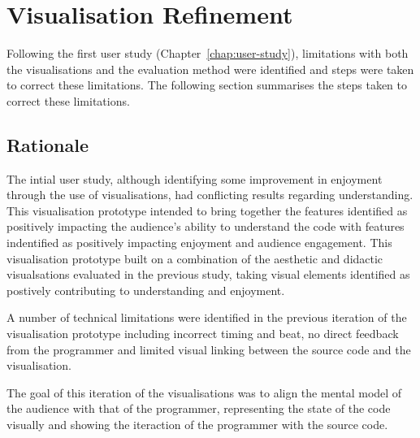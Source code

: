 
\chapter{Visualisation Refinement}
\label{chap:visualisation-refinement}


Following the first user study (Chapter~\ref{chap:user-study}), limitations with both the visualisations and the evaluation method were identified and steps were taken to correct these limitations. The following section summarises the steps taken to correct these limitations.

\section{Rationale}

The intial user study, although identifying some improvement in enjoyment through the use of visualisations, had conflicting results regarding understanding. This visualisation prototype intended to bring together the features identified as positively impacting the audience's ability to understand the code with features indentified as positively impacting enjoyment and audience engagement. This visualisation prototype built on a combination of the aesthetic and didactic visualsations evaluated in the previous study, taking visual elements identified as postively contributing to understanding and enjoyment.

A number of technical limitations were identified in the previous iteration of the visualisation prototype including incorrect timing and beat, no direct feedback from the programmer and limited visual linking between the source code and the visualisation.

The goal of this iteration of the visualisations was to align the mental model of the audience with that of the programmer, representing the state of the code visually and showing the iteraction of the programmer with the source code.

